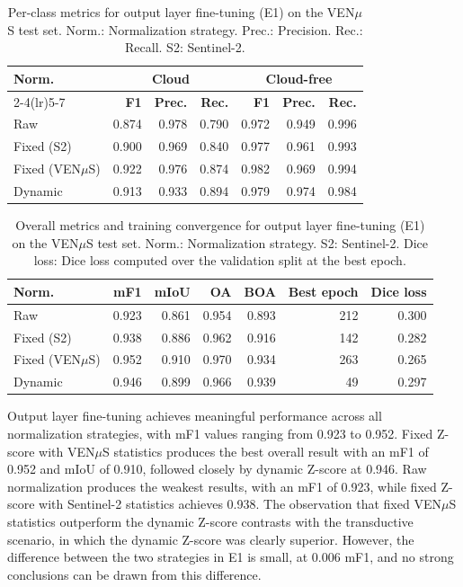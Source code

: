 \begin{table}[H]
\centering
\caption[Per-class metrics for output layer fine-tuning on the VEN$\mu$S test set.]{Per-class metrics for output layer fine-tuning (E1) on the VEN$\mu$S test set. Norm.: Normalization strategy. Prec.: Precision. Rec.: Recall. S2: Sentinel-2.}
\label{tab:e1_perclass}
\small
\begin{tabular}{lrrrrrr}
\toprule
\multirow{2}{*}{\textbf{Norm.}} & 
\multicolumn{3}{c}{\textbf{Cloud}} & 
\multicolumn{3}{c}{\textbf{Cloud-free}} \\
\cmidrule(lr){2-4}\cmidrule(lr){5-7}
& \textbf{F1} & \textbf{Prec.} & \textbf{Rec.} & 
\textbf{F1} & \textbf{Prec.} & \textbf{Rec.} \\
\midrule
Raw               & 0.874 & 0.978 & 0.790 & 0.972 & 0.949 & 0.996 \\
Fixed (S2)        & 0.900 & 0.969 & 0.840 & 0.977 & 0.961 & 0.993 \\
Fixed (VEN$\mu$S) & 0.922 & 0.976 & 0.874 & 0.982 & 0.969 & 0.994 \\
Dynamic           & 0.913 & 0.933 & 0.894 & 0.979 & 0.974 & 0.984 \\
\bottomrule
\end{tabular}
\end{table}

\begin{table}[H]
\centering
\caption[Overall metrics and training convergence for output layer fine-tuning.]{Overall metrics and training convergence for output layer fine-tuning (E1) on the VEN$\mu$S test set. Norm.: Normalization strategy. S2: Sentinel-2. Dice loss: Dice loss computed over the validation split at the best epoch.}
\label{tab:e1_overall}
\small
\begin{tabular}{lrrrrrr}
\toprule
\textbf{Norm.} & \textbf{mF1} & \textbf{mIoU} & 
\textbf{OA} & \textbf{BOA} & 
\textbf{Best epoch} & \textbf{Dice loss} \\
\midrule
Raw               & 0.923 & 0.861 & 0.954 & 0.893 & 212 & 0.300 \\
Fixed (S2)        & 0.938 & 0.886 & 0.962 & 0.916 & 142 & 0.282 \\
Fixed (VEN$\mu$S) & 0.952 & 0.910 & 0.970 & 0.934 & 263 & 0.265 \\
Dynamic           & 0.946 & 0.899 & 0.966 & 0.939 & 49  & 0.297 \\
\bottomrule
\end{tabular}
\end{table}

Output layer fine-tuning achieves meaningful performance across all normalization strategies, with mF1 values ranging from 0.923 to 0.952. Fixed Z-score with VEN$\mu$S statistics produces the best overall result with an mF1 of 0.952 and mIoU of 0.910, followed closely by dynamic Z-score at 0.946. Raw normalization produces the weakest results, with an mF1 of 0.923, while fixed Z-score with Sentinel-2 statistics achieves 0.938. The observation that fixed VEN$\mu$S statistics outperform the dynamic Z-score contrasts with the transductive scenario, in which the dynamic Z-score was clearly superior. However, the difference between the two strategies in E1 is small, at 0.006 mF1, and no strong conclusions can be drawn from this difference.

